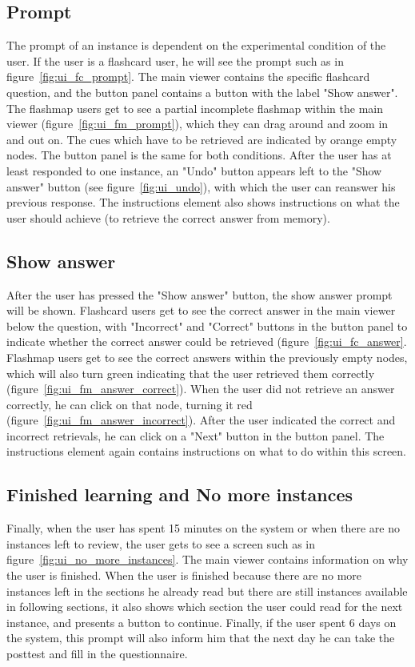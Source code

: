 \subsection{Prompt}

The prompt of an instance is dependent on the experimental condition of the user. If the user is a flashcard user, he will see the prompt such as in figure~\ref{fig:ui_fc_prompt}. The main viewer contains the specific flashcard question, and the button panel contains a button with the label "Show answer". The flashmap users get to see a partial incomplete flashmap within the main viewer (figure~\ref{fig:ui_fm_prompt}), which they can drag around and zoom in and out on. The cues which have to be retrieved are indicated by orange empty nodes. The button panel is the same for both conditions. After the user has at least responded to one instance, an "Undo" button appears left to the "Show answer" button (see figure~\ref{fig:ui_undo}), with which the user can reanswer his previous response. The instructions element also shows instructions on what the user should achieve (to retrieve the correct answer from memory).

\subsection{Show answer}

After the user has pressed the "Show answer" button, the show answer prompt will be shown. Flashcard users get to see the correct answer in the main viewer below the question, with "Incorrect" and "Correct" buttons in the button panel to indicate whether the correct answer could be retrieved (figure~\ref{fig:ui_fc_answer}. Flashmap users get to see the correct answers within the previously empty nodes, which will also turn green indicating that the user retrieved them correctly (figure~\ref{fig:ui_fm_answer_correct}). When the user did not retrieve an answer correctly, he can click on that node, turning it red (figure~\ref{fig:ui_fm_answer_incorrect}). After the user indicated the correct and incorrect retrievals, he can click on a "Next" button in the button panel. The instructions element again contains instructions on what to do within this screen.

\subsection{Finished learning and No more instances}

Finally, when the user has spent 15 minutes on the system or when there are no instances left to review, the user gets to see a screen such as in figure~\ref{fig:ui_no_more_instances}. The main viewer contains information on why the user is finished. When the user is finished because there are no more instances left in the sections he already read but there are still instances available in following sections, it also shows which section the user could read for the next instance, and presents a button to continue. Finally, if the user spent 6 days on the system, this prompt will also inform him that the next day he can take the posttest and fill in the questionnaire.

